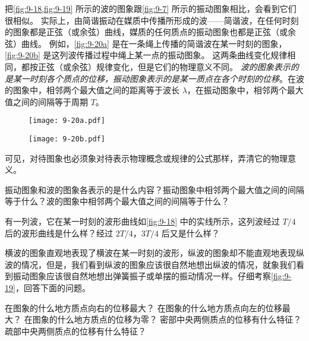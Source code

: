 把\cref{fig:9-18,fig:9-19} 所示的波的图象跟\cref{fig:9-7} 所示的振动图象相比，会看到它们很相似。
实际上，由简谐振动在媒质中传播所形成的波——简谐波，在任何时刻的图象都是正弦（或余弦）曲线，媒质的任何质点的振动图象也都是正弦（或余弦）曲线。
例如，\cref{fig:9-20a} 是在一条绳上传播的简谐波在某一时刻的图象，\cref{fig:9-20b} 是这列波传播过程中绳上某一点的振动图象。
这两条曲线变化规律相同，都按正弦（或余弦）规律变化，但是它们的物理意义不同。
\emph{波的图象表示的是某一时刻各个质点的位移，振动图象表示的是某一质点在各个时刻的位移}。在波的图象中，相邻两个最大值之间的距离等于波长 $\lambda$，在振动图象中，相邻两个最大值之间的间隔等于周期 $T$。
\begin{figure}
  \begin{minipage}{\linewidth}\centering
    \texttt{[image: 9-20a.pdf]}
    \label{fig:9-20a}
  \end{minipage}
  \begin{minipage}{\linewidth}\centering
    \texttt{[image: 9-20b.pdf]}
    \label{fig:9-20b}
  \end{minipage}
  \caption{}\label{fig:9-20}
\end{figure}

可见，对待图象也必须象对待表示物理概念或规律的公式那样，弄清它的物理意义。

\begin{Practice}
\begin{question}
  \item 振动图象和波的图象各表示的是什么内容？振动图象中相邻两个最大值之间的间隔等于什么？波的图象中相邻两个最大值之间的间隔等于什么？
  \item 有一列波，它在某一时刻的波形曲线如\cref{fig:9-18} 中的实线所示，这列波经过 $T/4$ 后的波形曲线是什么样？经过 $2T/4$，$3T/4$ 后又是什么样？
  \item 横波的图象直观地表现了横波在某一时刻的波形，纵波的图象却不能直观地表现纵波的情况，但是，我们看到纵波的图象应该很自然地想出纵波的情况，就象我们看到振动图象应该很自然地想出弹簧振子或单摆的振动情况一样。仔细考察\cref{fig:9-19}，回答下面的问题。
  \begin{tasks}
    \task 在图象的什么地方质点向右的位移最大？
    \task 在图象的什么地方质点向左的位移最大？
    \task 在图象的什么地方质点的位移为零？
    \task 密部中央两侧质点的位移有什么特征？
    \task 疏部中央两侧质点的位移有什么特征？
  \end{tasks}
\end{question}
\end{Practice}

